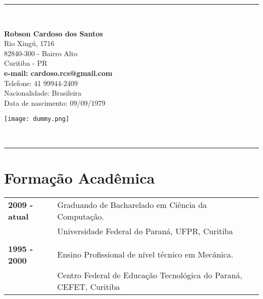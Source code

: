 \documentclass[pdftex, a4paper, 11pt]{article}
\begin{document}
\vspace*{.3cm}
\begin{center}
  \rule{.8\textwidth}{1pt}\\[10pt]
  \begin{minipage}{.55\textwidth}
    \LARGE\textbf{Robson Cardoso dos Santos}\\[13pt]
    \small Rio Xingú, 1716\\
    82840-300 - Bairro Alto\\
    Curitiba - PR\\[6pt]
    \textbf{e-mail: cardoso.rcs@gmail.com}\\
    Telefone: 41 99944-2409\\[6pt]
    \small Nacionalidade: Brasileira\\
    \small Data de nascimento: 09/09/1979\\
  \end{minipage}
  \begin{minipage}{.2\textwidth}
    \texttt{[image: dummy.png]}
  \end{minipage}\\[5pt]
  \rule{.8\textwidth}{1pt}
\end{center}
\vspace*{1cm}



\section*{Formação Acadêmica}
\begin{tabular}{ll}
  \textbf{2009 - atual} & Graduando de Bacharelado em Ciência da Computação.\\
  & Universidade Federal do Paraná, UFPR, Curitiba\\
  & \\
  \textbf{1995 - 2000} & Ensino Profissional de nível técnico em Mecânica.\\
  & Centro Federal de Educação Tecnológica do Paraná, CEFET, Curitiba\\
\end{tabular}
\end{document}
